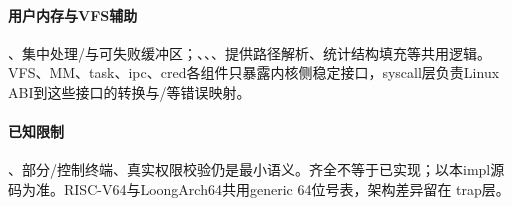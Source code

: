 \paragraph{用户内存与VFS辅助}

、集中处理/与可失败缓冲区；、、、提供路径解析、统计结构填充等共用逻辑。VFS、MM、task、ipc、cred各组件只暴露内核侧稳定接口，syscall层负责Linux ABI到这些接口的转换与/等错误映射。

\paragraph{已知限制}

、部分/控制终端、真实权限校验仍是最小语义。齐全不等于已实现；以本impl源码为准。RISC-V64与LoongArch64共用generic 64位号表，架构差异留在 trap层。

